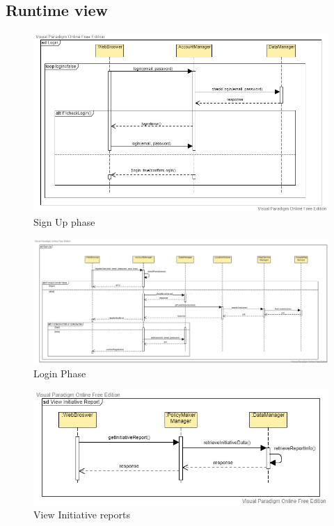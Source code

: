 \documentclass[table, 12pt]{article}
\begin{document}
\subsection{Runtime view}

\begin{center}
    \begin{figure}[H]
        \includegraphics[scale=0.42, center]{assets/SequenceDiagram/SignUp.jpg}
        \caption{Sign Up phase}
        \label{fig:signup}
    \end{figure}
\end{center}

\begin{center}
    \begin{figure}[H]
        \includegraphics[scale=0.42, center]{assets/SequenceDiagram/Login.jpg}
        \caption{Login Phase}
        \label{fig: login}
    \end{figure}
\end{center}

\begin{center}
    \begin{figure}[H]
        \includegraphics[scale=0.42, center]{assets/SequenceDiagram/Report.jpg}
        \caption{View Initiative reports}
        \label{fig: report}
    \end{figure}
\end{center}
\end{document}
